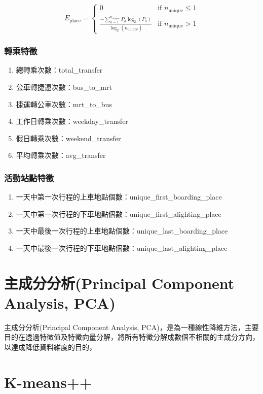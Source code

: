 \[E_{\text{place}} = 
\begin{cases} 
0 & \text{if } n_{\text{unique}} \leq 1 \\ 
\frac{ -\sum_{a=1}^{n_{\text{unique}}} P_a \log_2(P_a) }{ \log_2(n_{\text{unique}}) } & \text{if } n_{\text{unique}} > 1 
\end{cases}\]

\subsubsection{轉乘特徵}\label{ux8f49ux4e58ux7279ux5fb5}

\begin{enumerate}
\def\labelenumi{\arabic{enumi}.}
\tightlist
\item
  總轉乘次數：total\_transfer
\item
  公車轉捷運次數：bus\_to\_mrt
\item
  捷運轉公車次數：mrt\_to\_bus
\item
  工作日轉乘次數：weekday\_transfer
\item
  假日轉乘次數：weekend\_transfer
\item
  平均轉乘次數：avg\_transfer
\end{enumerate}

\subsubsection{活動站點特徵}\label{ux6d3bux52d5ux7ad9ux9edeux7279ux5fb5}

\begin{enumerate}
\def\labelenumi{\arabic{enumi}.}
\tightlist
\item
  一天中第一次行程的上車地點個數：unique\_first\_boarding\_place
\item
  一天中第一次行程的下車地點個數：unique\_first\_alighting\_place
\item
  一天中最後一次行程的上車地點個數：unique\_last\_boarding\_place
\item
  一天中最後一次行程的下車地點個數：unique\_last\_alighting\_place
\end{enumerate}

\section{主成分分析(Principal Component Analysis,
PCA)}\label{ux4e3bux6210ux5206ux5206ux6790principal-component-analysis-pca}

主成分分析(Principal Component Analysis,
PCA)，是為一種線性降維方法，主要目的在透過特徵值及特徵向量分解，將所有特徵分解成數個不相關的主成分方向，以達成降低資料維度的目的，

\section{K-means++}\label{k-means}
